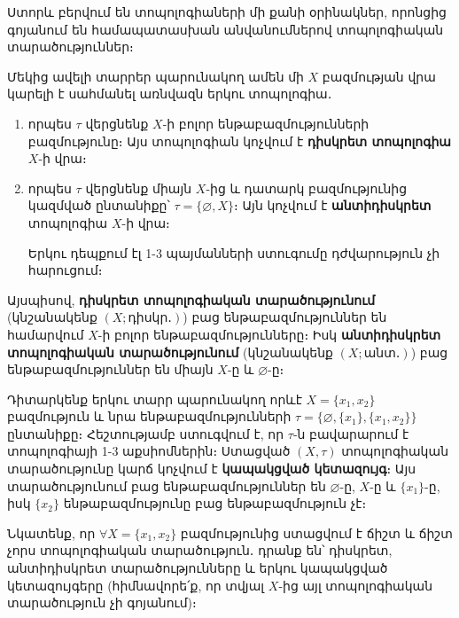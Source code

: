 \documentclass[./main.tex]{subfiles}
\begin{document}

\par Ստորև բերվում են տոպոլոգիաների մի քանի օրինակներ, որոնցից գոյանում են համապատասխան անվանումներով տոպոլոգիական տարածություններ։

\begin{example}\label{ch4ex1}
Մեկից ավելի տարրեր պարունակող ամեն մի $X$ բազմության վրա կարելի է սահմանել առնվազն երկու տոպոլոգիա․
\begin{enumerate}
    \item[ա)] որպես $\tau$ վերցնենք $X$-ի բոլոր ենթաբազմությունների բազմությունը։
	Այս տո\-պո\-լոգիան կոչվում է \textbf{դիսկրետ տոպոլոգիա} $X$-ի վրա։
	\item[բ)] որպես $\tau$ վերցնենք միայն $X$-ից և դատարկ բազմությունից կազմված ընտա\-նիքը՝ $\tau=\{\varnothing, X\}$։ Այն կոչվում է \textbf{անտիդիսկրետ} տոպոլոգիա $X$-ի վրա։
    \par	Երկու դեպքում էլ 1-3 պայմանների ստուգումը դժվարություն չի հարուցում։
\end{enumerate}
\end{example}

Այսպիսով, \textbf{դիսկրետ տոպոլոգիական տարածությունում} (կնշանակենք \linebreak $(X; \textbf{դիսկր․})$) բաց ենթաբազմութ\-յուն\-ներ են համարվում $X$-ի բոլոր ենթաբազմու\-թյունները։ Իսկ \textbf{անտի\-դիսկրետ տոպո\-լոգիա\-կան տարածությունում} (կնշանակենք \linebreak $(X; \textbf{անտ․})$) բաց ենթաբազ\-մություններ են միայն $X$-ը և $\varnothing$-ը։


\begin{example}\label{ch4ex2}
Դիտարկենք երկու տարր պարունակող որևէ $X=\{x_1,x_2\}$ բազմու\-թյուն և  նրա ենթաբազմությունների  $\tau=\{ \varnothing,\{x_1\},\{x_1,x_2\}\}$ ընտանիքը։ Հեշտու\-թյամբ ստուգվում է, որ $\tau$-ն բավարարում է տոպոլոգիայի 1-3 աքսիոմներին։ Ստաց\-ված $(X,\tau)$ տոպոլոգիական տարածությունը կարճ կոչվում է \textbf{կապակցված կետա\-զույգ}։ Այս տարածությունում բաց ենթաբազմություններ են $\varnothing$-ը, $X$-ը և $\{x_1\}$-ը, իսկ $\{x_2\}$ ենթաբազմությունը բաց ենթաբազմություն չէ։

\par Նկատենք, որ $\forall X=\{x_1, x_2\}$ բազմությունից ստացվում է ճիշտ և ճիշտ չորս տոպոլոգիական տարածություն․ դրանք են՝ դիսկրետ, անտիդիսկրետ տարածու\-թյուն\-ները և երկու կապակցված կետազույգերը (հիմնավորե՛ք, որ տվյալ $X$-ից այլ տոպոլոգիական տարածություն չի գոյանում)։
\end{example}
\end{document}

